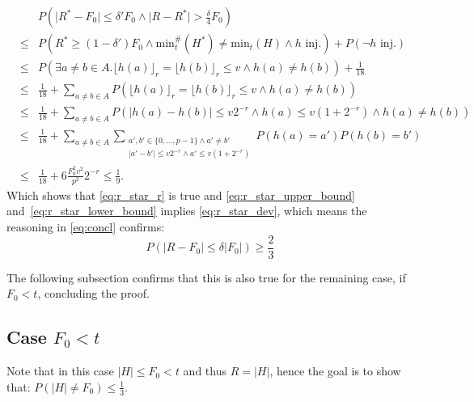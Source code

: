 \documentclass[11pt,a4paper]{article}
\newcommand{\size}[1]{\lvert#1\rvert}
\begin{document}
\begin{eqnarray*}
    & & P\left( \size{R^*-F_0} \leq \delta' F_0 \wedge \size{R-R^*} > \frac{\delta}{4} F_0 \right) \\
    & \leq & P\left( R^* \geq (1-\delta') F_0 \wedge \mathrm{min}_t^{\#}(H^*) \neq \mathrm{min}_t(H) \wedge h \textrm{ inj.}\right) + P(\neg h \textrm{ inj.}) \\
    & \leq & P\left( \exists a \neq b \in A. \lfloor h(a) \rfloor_r = \lfloor h(b) \rfloor_r \leq v \wedge h(a) \neq h(b) \right) + \frac{1}{18} \\
    & \leq & \frac{1}{18} + \sum_{a \neq b \in A} P\left(\lfloor h(a) \rfloor_r = \lfloor h(b) \rfloor_r \leq v \wedge h(a) \neq h(b) \right) \\
    & \leq & \frac{1}{18} + \sum_{a \neq b \in A} P\left(\size{h(a) - h(b)} \leq v 2^{-r} \wedge h(a) \leq v (1+2^{-r}) \wedge h(a) \neq h(b) \right) \\
    & \leq & \frac{1}{18} + \sum_{a \neq b \in A} \sum_{\substack{a', b' \in \{0,\ldots, p-1\} \wedge a' \neq b' \\ \size{a'-b'} \leq v 2^{-r} \wedge a' \leq v (1+2^{-r})}} P(h(a) = a') P(h(b)= b') \\
    & \leq & \frac{1}{18} + 6 \frac{F_0^2 v^2}{p^2} 2^{-r} \leq \frac{1}{9} \textrm{.}
\end{eqnarray*}
Which shows that \autoref{eq:r_star_r} is true and \autoref{eq:r_star_upper_bound} and~\ref{eq:r_star_lower_bound} implies 
\autoref{eq:r_star_dev}, which means the reasoning in \autoref{eq:concl} confirms:
\begin{equation}
    P(\size{R - F_0} \leq \delta \size{F_0}) \geq \frac{2}{3}
\end{equation}

The following subsection confirms that this is also true for the remaining case, if $F_0 < t$, concluding the proof.
\subsection{Case $F_0 < t$}
Note that in this case $\size{H} \leq F_0 < t$ and thus $R = \size{H}$, hence the goal is to show that:
$P(\size{H} \neq F_0) \leq \frac{1}{3}$.
\end{document}

